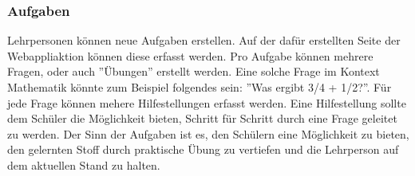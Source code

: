 \subsubsection*{Aufgaben}
Lehrpersonen können neue Aufgaben erstellen. Auf der dafür erstellten Seite der Webappliaktion können diese erfasst werden. Pro Aufgabe können mehrere Fragen, oder auch ''Übungen'' erstellt werden. Eine solche Frage im Kontext Mathematik könnte zum Beispiel folgendes sein: ''Was ergibt 3/4 + 1/2?''. Für jede Frage können mehere Hilfestellungen erfasst werden. Eine Hilfestellung sollte dem Schüler die Möglichkeit bieten, Schritt für Schritt durch eine Frage geleitet zu werden. Der Sinn der Aufgaben ist es, den Schülern eine Möglichkeit zu bieten, den gelernten Stoff durch praktische Übung zu vertiefen und die Lehrperson auf dem aktuellen Stand zu halten.




\newpage